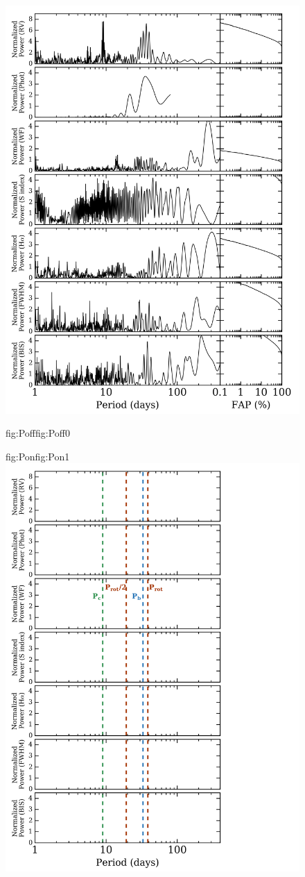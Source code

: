 \begin{figure}
  \centering
  \includegraphics[width=0.8\hsize]{figures/periodograms_bkgd.png}%
  \hspace{-0.8\hsize}%
  \begin{ocg}{fig:Poff}{fig:Poff}{0}%
  \end{ocg}%
  \begin{ocg}{fig:Pon}{fig:Pon}{1}%
    \includegraphics[width=0.8\hsize]{figures/periodograms_Ps.png}%

\end{ocg}
\end{figure}
